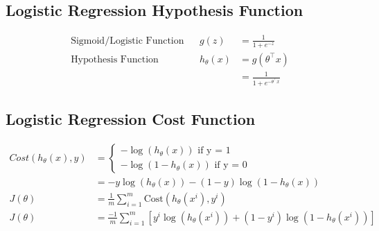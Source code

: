 \documentclass[11pt, oneside]{article}
\begin{document}
\subsection{Logistic Regression Hypothesis Function}
	\begin{align*}
		\text{Sigmoid/Logistic\ Function} && 
			g(z) &= \frac{1}{1+e^{-z}} \\
		\text{Hypothesis\ Function} && 
			h_\theta(x) &= g(\theta^\intercal x) \\
		\text{} && 
			&= \frac{1}{1+e^{-\theta^\intercal x}} 
	\end{align*}
\subsection{Logistic Regression Cost Function}
	\begin{align*}
		Cost(h_\theta(x), y) &= 
			\begin{cases} 
				-\log(h_\theta(x)) \text{ if y = 1 } \\
				-\log(1 - h_\theta(x)) \text{ if y = 0}
			\end{cases}\\
		&= -y\log(h_\theta(x)) - (1-y)\log(1 - h_\theta(x)) \\
		J(\theta) &= \frac{1}{m} \sum^m_{i=1}\text{Cost}(h_\theta(x^i),y^i) \\
		J(\theta) &= \frac{-1}{m} \sum^m_{i=1} \left[y^i\log(h_\theta(x^i)) + (1-y^i)\log(1 - h_\theta(x^i))\right] 
	\end{align*}
\end{document}
